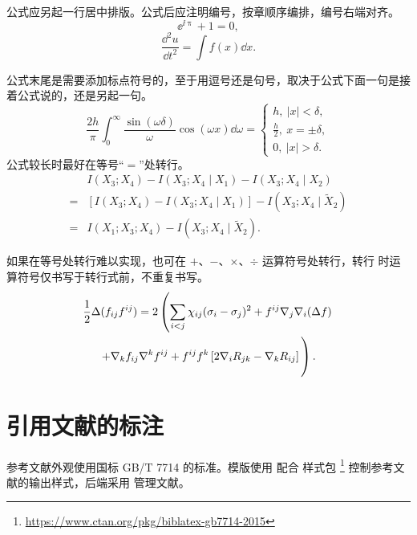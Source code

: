 公式应另起一行居中排版。公式后应注明编号，按章顺序编排，编号右端对齐。
\begin{equation}
  \ee^{\ii\uppi} + 1 = 0,
\end{equation}
\begin{equation}
  \frac{\dd^2 u}{\dd t^2} = \int f(x) \dd x.
\end{equation}

公式末尾是需要添加标点符号的，至于用逗号还是句号，取决于公式下面一句是接着公式说的，还是另起一句。
\begin{equation}
		\frac{2h}{\pi}\int_{0}^{\infty}\frac{\sin\left( \omega\delta \right)}{\omega}
		\cos\left( \omega x \right) \dd\omega = 
		\begin{cases}
				h, \ \left| x \right| < \delta, \\
				\frac{h}{2}, \ x = \pm \delta, \\
				0, \ \left| x \right| > \delta.
		\end{cases}
\end{equation}
公式较长时最好在等号“$=$”处转行。
\begin{align}
    & I (X_3; X_4) - I (X_3; X_4 \mid X_1) - I (X_3; X_4 \mid X_2) \nonumber \\
  = & [I (X_3; X_4) - I (X_3; X_4 \mid X_1)] - I (X_3; X_4 \mid \tilde{X}_2) \\
  = & I (X_1; X_3; X_4) - I (X_3; X_4 \mid \tilde{X}_2).
\end{align}

如果在等号处转行难以实现，也可在 $+$、$-$、$\times$、$\div$ 运算符号处转行，转行
时运算符号仅书写于转行式前，不重复书写。
\begin{multline}
  \frac{1}{2} \Delta (f_{ij} f^{ij}) =
    2 \left(\sum_{i<j} \chi_{ij}(\sigma_{i} - \sigma_{j})^{2}
    + f^{ij} \nabla_{j} \nabla_{i} (\Delta f) \right. \\
  \left. + \nabla_{k} f_{ij} \nabla^{k} f^{ij} +
    f^{ij} f^{k} \left[2\nabla_{i}R_{jk}
    - \nabla_{k} R_{ij} \right] \vphantom{\sum_{i<j}} \right).
\end{multline}


\section{引用文献的标注}

参考文献外观使用国标 GB/T 7714 的标准。模版使用 \BibLaTeX{}
配合  样式包%
\footnote{\url{https://www.ctan.org/pkg/biblatex-gb7714-2015}}%
控制参考文献的输出样式，后端采用  管理文献。

